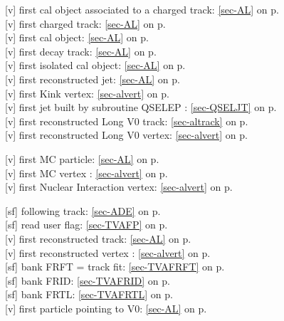  [v] first cal object associated to a charged
 track:
 \ref{sec-AL} on p.~\pageref{sec-AL}\\
 [v] first charged track: \ref{sec-AL} on p.~\pageref{sec-AL}\\
 [v] first cal object: \ref{sec-AL} on p.~\pageref{sec-AL}\\
 [v] first decay track: \ref{sec-AL} on p.~\pageref{sec-AL}\\
 [v] first isolated cal object: \ref{sec-AL} on p.~\pageref{sec-AL}\\
 [v] first reconstructed jet: \ref{sec-AL} on p.~\pageref{sec-AL}\\
 [v] first Kink vertex: \ref{sec-alvert} on p.~\pageref{sec-alvert}\\
 [v] first jet built by subroutine QSELEP : \ref{sec-QSELJT} on p.~\pageref{sec-QSELJT}  \\
 [v] first reconstructed Long V0 track: \ref{sec-altrack} on p.~\pageref{sec-altrack}\\
 [v] first reconstructed Long V0 vertex: \ref{sec-alvert} on p.~\pageref{sec-alvert}
 
 [v] first MC particle: \ref{sec-AL} on p.~\pageref{sec-AL}\\
 [v] first MC vertex  : \ref{sec-alvert} on p.~\pageref{sec-alvert}\\
 [v] first Nuclear Interaction vertex: \ref{sec-alvert} on p.~\pageref{sec-alvert}
 
 [sf] following track: \ref{sec-ADE} on p.~\pageref{sec-ADE}\\
 [sf] read user flag: \ref{sec-TVAFP} on p.~\pageref{sec-TVAFP}\\
 [v] first reconstructed track: \ref{sec-AL} on p.~\pageref{sec-AL}\\
 [v] first reconstructed vertex  : \ref{sec-alvert} on p.~\pageref{sec-alvert}\\
 [sf] bank FRFT = track fit: \ref{sec-TVAFRFT} on p.~\pageref{sec-TVAFRFT}\\
 [sf] bank FRID: \ref{sec-TVAFRID} on p.~\pageref{sec-TVAFRID}\\
 [sf] bank FRTL: \ref{sec-TVAFRTL} on p.~\pageref{sec-TVAFRTL}\\
 [v] first particle pointing to V0: \ref{sec-AL} on p.~\pageref{sec-AL}
 
